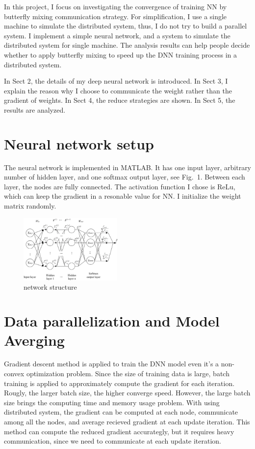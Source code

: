 \documentclass{article}
\begin{document}
In this project, I focus on investigating the convergence of training NN by butterfly mixing communication strategy. For simplification, I use a single machine to simulate the distributed system, thus, I do not try to build a parallel system. I implement a simple neural network, and a system to simulate the distributed system for single machine. The analysis results can help people decide whether to apply butterfly mixing to speed up the DNN training process in a distributed system.

In Sect 2, the details of my deep neural network is introduced. In Sect 3, I explain the reason why I choose to communicate the weight rather than the gradient of weights. In Sect 4, the reduce strategies are shown. In Sect 5, the results are analyzed.  

\section{Neural network setup}

The neural network is implemented in MATLAB. It has one input layer, arbitrary number of hidden layer, and one softmax output layer, see Fig.~1. Between each layer, the nodes are fully connected. The activation function I chose is ReLu, which can keep the gradient in a resonable value for NN. I initialize the weight matrix randomly.

\begin{figure}[h!]

  \centering
    \includegraphics[width=0.45\textwidth]{cs289_6.jpg}
  \caption{network structure}
\end{figure}

\section{Data parallelization and Model Averging}
Gradient descent method is applied to train the DNN model even it's a non-convex optimization problem. Since the size of training data is large, batch training is applied to approximately compute the gradient for each iteration. Rougly, the larger batch size, the higher converge speed. However, the large batch size brings the computing time and memory usage problem. With using distributed system, the gradient can be computed at each node, communicate among all the nodes, and average recieved gradient at each update iteration. This method can compute the reduced gradient accurategly, but it requires heavy communication, since we need to communicate at each update iteration. \\
\end{document}

